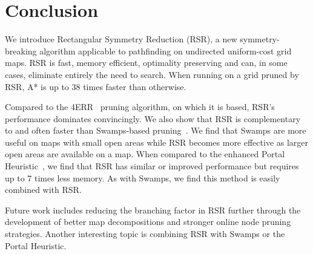 \section{Conclusion}
We introduce Rectangular Symmetry Reduction (RSR), a new symmetry-breaking algorithm
applicable to pathfinding on undirected uniform-cost grid maps. RSR is fast,
memory efficient, optimality preserving and can, in some cases, eliminate
entirely the need to search.  When running on a grid pruned by RSR, A* is up to
38 times faster than otherwise.
\par
Compared to the 4ERR~\cite{harabor10} pruning algorithm, on which it is based,
RSR's performance dominates convincingly.
We also show that RSR is complementary to and often faster than Swamps-based
pruning~\cite{pochter10}.
We find that Swamps are more useful on maps with small open areas
while RSR becomes more effective as larger open areas are available on a map. 
When compared to the enhanced Portal Heuristic~\cite{goldenberg10}, we find that 
RSR has similar or improved performance but requires up to 7 times less memory.
As with Swamps, we find this method is easily combined with RSR.
\par
Future work includes reducing the branching factor in RSR further through the 
development of better map decompositions and stronger online node pruning
strategies.
Another interesting topic is combining RSR with Swamps or the Portal Heuristic.
